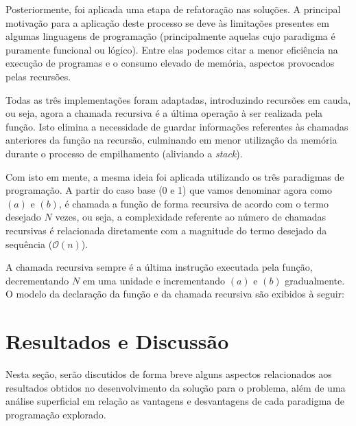 \documentclass[a4paper, 12pt]{article}
\begin{document}
\begin{center}
    \vspace{0.5cm}
\end{center}

Posteriormente, foi aplicada uma etapa de refatoração nas soluções. A principal motivação para a aplicação deste processo se deve às limitações presentes em algumas linguagens de programação (principalmente aquelas cujo paradigma é puramente funcional ou lógico). Entre elas podemos citar a menor eficiência na execução de programas e o consumo elevado de memória, aspectos provocados pelas recursões.

Todas as três implementações foram adaptadas, introduzindo recursões em cauda, ou seja, agora a chamada recursiva é a última operação à ser realizada pela função. Isto elimina a necessidade de guardar informações referentes às chamadas anteriores da função na recursão, culminando em menor utilização da memória durante o processo de empilhamento (aliviando a \emph{stack}).

Com isto em mente, a mesma ideia foi aplicada utilizando os três paradigmas de programação. A partir do caso base (0 e 1) que vamos denominar agora como \((a)\) e \((b)\), é chamada a função de forma recursiva de acordo com o termo desejado \(N\) vezes, ou seja, a complexidade referente ao número de chamadas recursivas é relacionada diretamente com a magnitude do termo desejado da sequência ($\mathcal{O}(n)$). 

A chamada recursiva sempre é a última instrução executada pela função, decrementando \(N\) em uma unidade e incrementando \((a)\) e \((b)\) gradualmente. O modelo da declaração da função e da chamada recursiva são exibidos à seguir:

\begin{center}
    \vspace{0.5cm}
\end{center}

\section{Resultados e Discussão}

Nesta seção, serão discutidos de forma breve alguns aspectos relacionados aos resultados obtidos no desenvolvimento da solução para o problema, além de uma análise superficial em relação as vantagens e desvantagens de cada paradigma de programação explorado.
\end{document}
